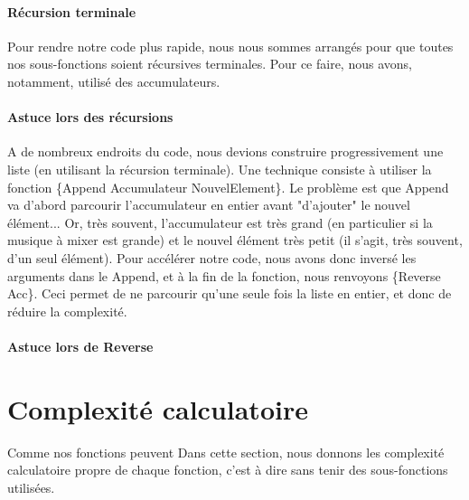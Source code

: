 \documentclass[12pt,a4paper]{article}
\begin{document}
\paragraph{Récursion terminale}
Pour rendre notre code plus rapide, nous nous sommes arrangés pour que toutes nos sous-fonctions
 soient récursives terminales. Pour ce faire, nous avons, notamment, utilisé des accumulateurs.

\paragraph{Astuce lors des récursions}
A de nombreux endroits du code, nous devions construire progressivement une liste 
(en utilisant la récursion terminale). Une technique consiste à utiliser la fonction
\{Append Accumulateur NouvelElement\}. Le problème est que Append va d'abord parcourir
l'accumulateur en entier avant "d'ajouter" le nouvel élément... Or, très souvent, l'accumulateur est très grand (en particulier si la musique à mixer est grande) et le nouvel élément très petit (il s'agit, très souvent, d'un seul élément). Pour accélérer notre code, nous avons donc inversé les arguments dans le Append, et à la fin de la fonction, nous renvoyons \{Reverse Acc\}. Ceci permet de ne parcourir qu'une seule fois 
la liste en entier, et donc de réduire la complexité.

\paragraph{Astuce lors de Reverse}



\section{Complexité calculatoire}
Comme nos fonctions peuvent Dans cette section, nous donnons les complexité calculatoire
propre de chaque fonction, c'est à dire sans tenir des sous-fonctions
utilisées.
\end{document}
